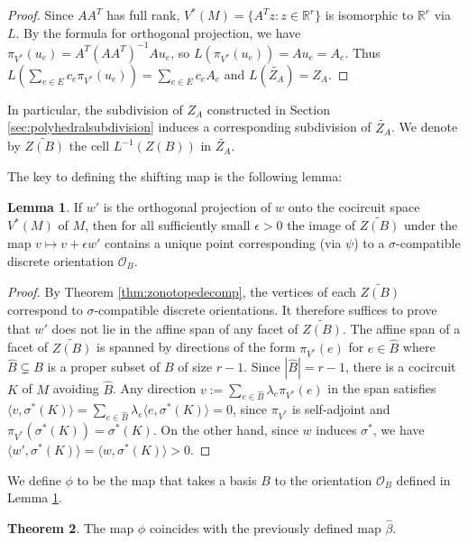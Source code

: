 \documentclass[12pt]{amsart}
\newcommand{\RR}{\mathbb{R}}
\numberwithin{equation}{section}
\theoremstyle{definition}
\newtheorem{theorem}{Theorem}[subsection]
\newtheorem{lemma}[theorem]{Lemma}
\begin{document}
\begin{proof}
Since $AA^T$ has full rank, $V^*(M)=\{A^Tz:z\in\RR^r\}$ is isomorphic to $\RR^r$ via $L$. By the formula for orthogonal projection, we have $\pi_{V^*}(u_e)=A^T(AA^T)^{-1}Au_e$, so $L(\pi_{V^*}(u_e))=Au_e=A_e$.  
Thus $L(\sum_{e\in E} c_e \pi_{V^*}(u_e))=\sum_{e\in E} c_e A_e$ and $L(\widetilde{Z_A})=Z_A$.
\end{proof}

In particular, the subdivision of $Z_A$ constructed in Section \ref{sec:polyhedralsubdivision} 
induces a corresponding subdivision of $\widetilde{Z_A}$.  We denote by $\widetilde{Z(B)}$ the cell $L^{-1}(Z(B))$ in $\widetilde{Z_A}$.

\medskip

The key to defining the shifting map is the following lemma:

\begin{lemma} \label{lem:phiwelldefined}
If $w'$ is the orthogonal projection of $w$ onto the cocircuit space $V^*(M)$ of $M$, then for all sufficiently small $\epsilon > 0$ the image of $\widetilde{Z(B)}$ under the map $v \mapsto v + \epsilon w'$ contains a unique point corresponding (via $\psi$) to a $\sigma$-compatible discrete orientation ${\mathcal O}_B$.
\end{lemma}

\begin{proof} By Theorem \ref{thm:zonotopedecomp}, the vertices of each $\widetilde{Z(B)}$ correspond to $\sigma$-compatible discrete orientations. It therefore suffices to prove that $w'$ does not lie in the affine span of any facet of $\widetilde{Z(B)}$.
The affine span of a facet of $\widetilde{Z(B)}$ is spanned by directions of the form $\pi_{V^*}(e)$ for $e\in\hat{B}$ where $\hat{B}\subsetneq B$ is a proper subset of $B$ of size $r-1$.
Since $|\hat{B}|=r-1$, there is a cocircuit $K$ of $M$ avoiding $\hat{B}$. Any direction $v := \sum_{e\in\hat{B}}\lambda_e\pi_{V^*}(e)$ in the span satisfies $\langle v, \sigma^*(K)\rangle
=\sum_{e\in\hat{B}}\lambda_e\langle e, \sigma^*(K)\rangle=0$, since $\pi_{V^*}$ is self-adjoint and $\pi_{V^*}(\sigma^*(K))=\sigma^*(K)$. On the other hand, since $w$ induces $\sigma^*$, we have $\langle w', \sigma^*(K)\rangle=\langle w,\sigma^*(K)\rangle>0$.
\end{proof}

We define $\phi$ to be the map that takes a basis $B$ to the orientation ${\mathcal O}_B$ defined in Lemma \ref{lem:phiwelldefined}.

\begin{theorem} \label{thm:phibetaequal}
The map $\phi$ coincides with the previously defined map $\hat{\beta}$.
\end{theorem}
\end{document}
